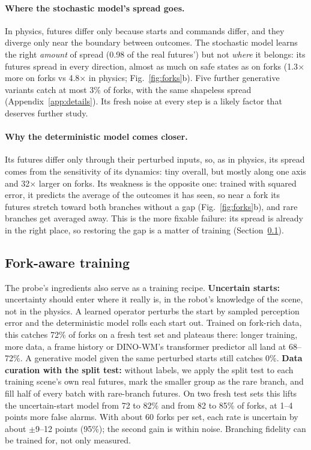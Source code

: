 \documentclass{article}
\begin{document}
\paragraph{Where the stochastic model's spread goes.} In physics, futures differ only because starts and
commands differ, and they diverge only near the boundary between outcomes. The stochastic model learns the right \emph{amount} of spread (0.98 of the real futures') but not
\emph{where} it belongs: its futures spread in every direction, almost as much on safe states as on forks
(1.3$\times$ more on forks vs 4.8$\times$ in physics; Fig.~\ref{fig:forks}b). Five further generative variants catch at most
3\% of forks, with the same shapeless spread (Appendix~\ref{app:details}). Its fresh noise at every step
is a likely factor that deserves further study.

\paragraph{Why the deterministic model comes closer.} Its futures differ only through their perturbed
inputs, so, as in physics, its spread comes from the sensitivity of its dynamics: tiny overall, but mostly
along one axis and 32$\times$ larger on forks. Its weakness is the opposite one: trained with squared error,
it predicts the average of the outcomes it has seen, so near a fork its futures stretch toward both
branches without a gap (Fig.~\ref{fig:forks}b), and rare branches get averaged away. This is the more
fixable failure: its spread is already in the right place, so restoring the gap is a matter of training
(Section~\ref{sec:train}).

\subsection{Fork-aware training}\label{sec:train}
The probe's ingredients also serve as a training recipe. \textbf{Uncertain starts:} uncertainty should
enter where it really is, in the robot's knowledge of the scene, not in the physics. A learned operator
perturbs the start by sampled perception error and the deterministic model rolls each start out. Trained
on fork-rich data, this catches 72\% of forks on a fresh test set and plateaus there: longer training, more
data, a frame history or DINO-WM's transformer predictor \citep{zhou2025dinowm} all land at 68--72\%. A
generative model given the same perturbed starts still catches 0\%. \textbf{Data curation with the split test:} without labels, we apply the split test to each
training scene's own real futures, mark the smaller group as the rare branch, and fill half of every batch
with rare-branch futures. On two fresh test sets this lifts the uncertain-start model from 72 to 82\% and
from 82 to 85\% of forks, at 1--4 points more false alarms. With about 60 forks per set, each rate is
uncertain by about $\pm$9--12 points (95\%); the second gain is within noise. Branching fidelity can be trained for, not only measured.
\end{document}
